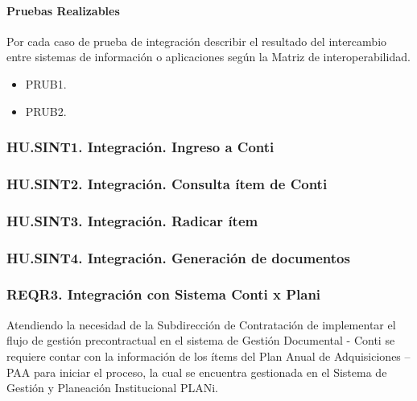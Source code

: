 \documentclass[
  paper=a4,
  ,captions=tableheading
]{scrartcl}
\providecommand{\tightlist}{%
  \setlength{\itemsep}{0pt}\setlength{\parskip}{0pt}}
\begin{document}
\paragraph{Pruebas Realizables}\label{sec:pruebas-realizables-3}

Por cada caso de prueba de integración describir el resultado del
intercambio entre sistemas de información o aplicaciones según la Matriz
de interoperabilidad.

\begin{itemize}
\tightlist
\item
  PRUB1.
\item
  PRUB2.
\end{itemize}

\subsubsection{HU.SINT1. Integración. Ingreso a
Conti}\label{sec:hu.sint1.-integraciuxf3n.-ingreso-a-conti}

\subsubsection{HU.SINT2. Integración. Consulta ítem de
Conti}\label{sec:hu.sint2.-integraciuxf3n.-consulta-uxedtem-de-conti}

\subsubsection{HU.SINT3. Integración. Radicar
ítem}\label{sec:hu.sint3.-integraciuxf3n.-radicar-uxedtem}

\subsubsection{HU.SINT4. Integración. Generación de
documentos}\label{sec:hu.sint4.-integraciuxf3n.-generaciuxf3n-de-documentos}

\subsubsection{REQR3. Integración con Sistema Conti x
Plani}\label{sec:reqr3.-integraciuxf3n-con-sistema-conti-x-plani}

Atendiendo la necesidad de la Subdirección de Contratación de
implementar el flujo de gestión precontractual en el sistema de Gestión
Documental - Conti se requiere contar con la información de los ítems
del Plan Anual de Adquisiciones -- PAA para iniciar el proceso, la cual
se encuentra gestionada en el Sistema de Gestión y Planeación
Institucional PLANi.
\end{document}
